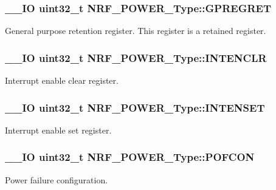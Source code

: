 \subsubsection[{G\+P\+R\+E\+G\+R\+E\+T}]{\setlength{\rightskip}{0pt plus 5cm}\+\_\+\+\_\+\+I\+O uint32\+\_\+t N\+R\+F\+\_\+\+P\+O\+W\+E\+R\+\_\+\+Type\+::\+G\+P\+R\+E\+G\+R\+E\+T}\label{struct_n_r_f___p_o_w_e_r___type_afc9bb30a1dad8afa94fc6793420443f8}
General purpose retention register. This register is a retained register. \hypertarget{struct_n_r_f___p_o_w_e_r___type_a82131597cbcc2f0831af47da96542063}{}
\subsubsection[{I\+N\+T\+E\+N\+C\+L\+R}]{\setlength{\rightskip}{0pt plus 5cm}\+\_\+\+\_\+\+I\+O uint32\+\_\+t N\+R\+F\+\_\+\+P\+O\+W\+E\+R\+\_\+\+Type\+::\+I\+N\+T\+E\+N\+C\+L\+R}\label{struct_n_r_f___p_o_w_e_r___type_a82131597cbcc2f0831af47da96542063}
Interrupt enable clear register. \hypertarget{struct_n_r_f___p_o_w_e_r___type_a9d4e03e33a7dd0a14c4980ca66ab69ee}{}
\subsubsection[{I\+N\+T\+E\+N\+S\+E\+T}]{\setlength{\rightskip}{0pt plus 5cm}\+\_\+\+\_\+\+I\+O uint32\+\_\+t N\+R\+F\+\_\+\+P\+O\+W\+E\+R\+\_\+\+Type\+::\+I\+N\+T\+E\+N\+S\+E\+T}\label{struct_n_r_f___p_o_w_e_r___type_a9d4e03e33a7dd0a14c4980ca66ab69ee}
Interrupt enable set register. \hypertarget{struct_n_r_f___p_o_w_e_r___type_a7a6682dae9d2db3adcfec5cc85c65954}{}
\subsubsection[{P\+O\+F\+C\+O\+N}]{\setlength{\rightskip}{0pt plus 5cm}\+\_\+\+\_\+\+I\+O uint32\+\_\+t N\+R\+F\+\_\+\+P\+O\+W\+E\+R\+\_\+\+Type\+::\+P\+O\+F\+C\+O\+N}\label{struct_n_r_f___p_o_w_e_r___type_a7a6682dae9d2db3adcfec5cc85c65954}
Power failure configuration. \hypertarget{struct_n_r_f___p_o_w_e_r___type_af84eee699f83f85223395005046f0664}{}
